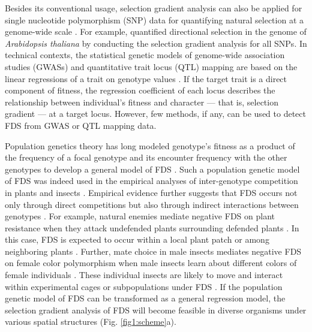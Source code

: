 \documentclass[12pt,]{article}
\begin{document}
Besides its conventional usage, selection gradient analysis can also be applied for single nucleotide polymorphism (SNP) data for quantifying natural selection at a genome-wide scale \citep{durham_genome-wide_2014, fisher_genetic_2016, exposito2019natural}. For example, \cite{exposito2019natural} quantified directional selection in the genome of \textit{Arabidopsis thaliana} by conducting the selection gradient analysis for all SNPs. In technical contexts, the statistical genetic models of genome-wide association studies (GWASs) and quantitative trait locus (QTL) mapping are based on the linear regressions of a trait on genotype values \citep{broman2009single, gondro2013genome}. If the target trait is a direct component of fitness, the regression coefficient of each locus describes the relationship between individual's fitness and character --- that is, selection gradient \citep{lande1983measurement} --- at a target locus. However, few methods, if any, can be used to detect FDS from GWAS or QTL mapping data. 

Population genetics theory has long modeled genotype’s fitness as a product of the frequency of a focal genotype and its encounter frequency with the other genotypes to develop a general model of FDS \citep{wright1948roles, clarke1964frequency, schutz1969inter, cockerham1972frequency, asmussen_frequency-dependent_1990, trotter2007frequency, schneider_maximization_2008}. Such a population genetic model of FDS was indeed used in the empirical analyses of inter-genotype competition in plants \citep{schutz1969inter} and insects \citep{alvarez2005models}. Empirical evidence further suggests that FDS occurs not only through direct competitions but also through indirect interactions between genotypes \citep{antonovics1984experimental,gigord2001negative,takahashi2010negative,sato2017herbivore}. For example, natural enemies mediate negative FDS on plant resistance when they attack undefended plants surrounding defended plants \citep{antonovics1984experimental, brunet2000disease, sato2017herbivore}. In this case, FDS is expected to occur within a local plant patch or among neighboring plants \citep[][cf. Fig. \ref{fig1:scheme}a bottom]{janzen1970herbivores, connell1971role, molofsky2001coexistence, browne2016frequency}. Further, mate choice in male insects mediates negative FDS on female color polymorphism when male insects learn about different colors of female individuals \citep{van2001frequency,takahashi2010negative}. These individual insects are likely to move and interact within experimental cages or subpopulations under FDS \citep[][cf. Fig. \ref{fig1:scheme}a top]{cosmidis1999rarer,fitzpatrick2007maintaining,takahashi2014evolution}. If the population genetic model of FDS can be transformed as a general regression model, the selection gradient analysis of FDS will become feasible in diverse organisms under various spatial structures (Fig. \ref{fig1:scheme}a).
\end{document}
